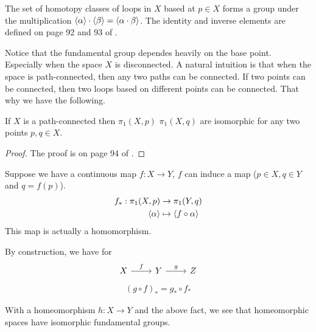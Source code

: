 \begin{thm}
    The set of homotopy classes of loops in $X$ based at $p\in X$
    forms a group under the multiplication
    $\braket{\alpha}\cdot\braket{\beta}=\braket{\alpha\cdot\beta}$.
    The identity and inverse elements are defined on page 92 and 93 of
    \cite{book}.
\end{thm}
\begin{remark}
    Notice that the fundamental group dependes heavily on the base
    point. Especially when the space $X$ is disconnected. A natural
    intuition is that when the space is path-connected, then any two
    paths can be connected. If two points can be connected, then two
    loops based on different points can be connected. That why we have
    the following.
\end{remark}
\begin{thm}
    If $X$ is a path-connected then $\pi_1(X,p)$ $\pi_1(X,q)$ are
    isomorphic for any two points $p,q\in X$.
\end{thm}
\begin{proof}
    The proof is on page 94 of \cite{book}.
\end{proof}
\begin{defi}[$f_*$]
Suppose we have a continuous map $f:X\to Y$, $f$ can induce a map
($p\in X,q\in Y$ and $q=f(p)$).
    \begin{align}
        f_* : \pi_1(X,p) &\to \pi_1(Y,q) \\
        \braket{\alpha} &\mapsto \braket{f\circ \alpha}
    \end{align}
This map is actually a homomorphism.
\end{defi}
\begin{fact}
By construction, we have for
$$ \begin{tikzcd}[]
    X\ar[r,"f"] & Y\ar[r,"g"] & Z
\end{tikzcd}$$
\begin{align}
    (g\circ f)_* = g_* \circ f_*
\end{align}
\end{fact}
\begin{fact}
With a homeomorphism $h:X\to Y$ and the above fact, we see that
homeomorphic spaces have isomorphic fundamental groups.
\end{fact}
